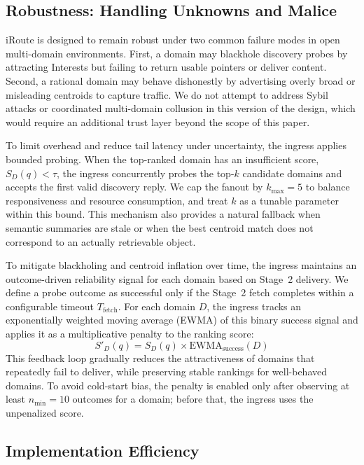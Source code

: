 \documentclass[journal]{IEEEtran}
\newcommand{\sysname}{iRoute}
\begin{document}
\subsection{Robustness: Handling Unknowns and Malice}
\label{sec:spec_robustness}

\sysname{} is designed to remain robust under two common failure modes in open multi-domain environments.
First, a domain may blackhole discovery probes by attracting Interests but failing to return usable pointers or deliver content.
Second, a rational domain may behave dishonestly by advertising overly broad or misleading centroids to capture traffic.
We do not attempt to address Sybil attacks or coordinated multi-domain collusion in this version of the design, which would require an additional trust layer beyond the scope of this paper.

To limit overhead and reduce tail latency under uncertainty, the ingress applies bounded probing.
When the top-ranked domain has an insufficient score, $S_D(q) < \tau$, the ingress concurrently probes the top-$k$ candidate domains and accepts the first valid discovery reply.
We cap the fanout by $k_{\max}=5$ to balance responsiveness and resource consumption, and treat $k$ as a tunable parameter within this bound.
This mechanism also provides a natural fallback when semantic summaries are stale or when the best centroid match does not correspond to an actually retrievable object.

To mitigate blackholing and centroid inflation over time, the ingress maintains an outcome-driven reliability signal for each domain based on Stage~2 delivery.
We define a probe outcome as successful only if the Stage~2 fetch completes within a configurable timeout $T_{\text{fetch}}$.
For each domain $D$, the ingress tracks an exponentially weighted moving average (EWMA) of this binary success signal and applies it as a multiplicative penalty to the ranking score:
\begin{equation}
    S'_D(q) = S_D(q) \times \text{EWMA}_{\text{success}}(D)
\end{equation}
This feedback loop gradually reduces the attractiveness of domains that repeatedly fail to deliver, while preserving stable rankings for well-behaved domains.
To avoid cold-start bias, the penalty is enabled only after observing at least $n_{\min}=10$ outcomes for a domain; before that, the ingress uses the unpenalized score.

\subsection{Implementation Efficiency}
\label{sec:spec_impl}
\end{document}
